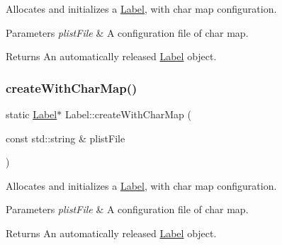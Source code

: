 Allocates and initializes a \hyperlink{classLabel}{Label}, with char map configuration.


\begin{DoxyParams}{Parameters}
{\em plist\+File} & A configuration file of char map.\\
\hline
\end{DoxyParams}
\begin{DoxyReturn}{Returns}
An automatically released \hyperlink{classLabel}{Label} object. 
\end{DoxyReturn}
\mbox{\label{classLabel_adc28b67efdaf4890cad4472a42c92c88}} 
\subsubsection{\texorpdfstring{create\+With\+Char\+Map()}{createWithCharMap()}\hspace{0.1cm}{\footnotesize\ttfamily [6/6]}}
{\footnotesize\ttfamily static \hyperlink{classLabel}{Label}$\ast$ Label\+::create\+With\+Char\+Map (\begin{DoxyParamCaption}\item[{const std\+::string \&}]{plist\+File }\end{DoxyParamCaption})\hspace{0.3cm}{\ttfamily [static]}}

Allocates and initializes a \hyperlink{classLabel}{Label}, with char map configuration.


\begin{DoxyParams}{Parameters}
{\em plist\+File} & A configuration file of char map.\\
\hline
\end{DoxyParams}
\begin{DoxyReturn}{Returns}
An automatically released \hyperlink{classLabel}{Label} object. 
\end{DoxyReturn}
\mbox{\label{classLabel_a2398a326a386a120f852ea1be924d11e}} 
